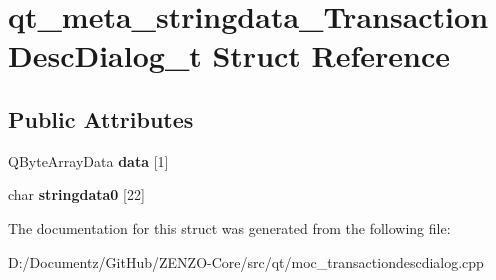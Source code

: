\hypertarget{structqt__meta__stringdata___transaction_desc_dialog__t}{}\section{qt\+\_\+meta\+\_\+stringdata\+\_\+\+Transaction\+Desc\+Dialog\+\_\+t Struct Reference}
\label{structqt__meta__stringdata___transaction_desc_dialog__t}
\subsection*{Public Attributes}
\begin{DoxyCompactItemize}
\item 
\mbox{\label{structqt__meta__stringdata___transaction_desc_dialog__t_a98bdf57f462bac46c24bf4a6aa6cdd45}} 
Q\+Byte\+Array\+Data {\bfseries data} \mbox{[}1\mbox{]}
\item 
\mbox{\label{structqt__meta__stringdata___transaction_desc_dialog__t_a959fc70767cd83ddb902dc1074e77375}} 
char {\bfseries stringdata0} \mbox{[}22\mbox{]}
\end{DoxyCompactItemize}


The documentation for this struct was generated from the following file\+:\begin{DoxyCompactItemize}
\item 
D\+:/\+Documentz/\+Git\+Hub/\+Z\+E\+N\+Z\+O-\/\+Core/src/qt/moc\+\_\+transactiondescdialog.\+cpp\end{DoxyCompactItemize}
